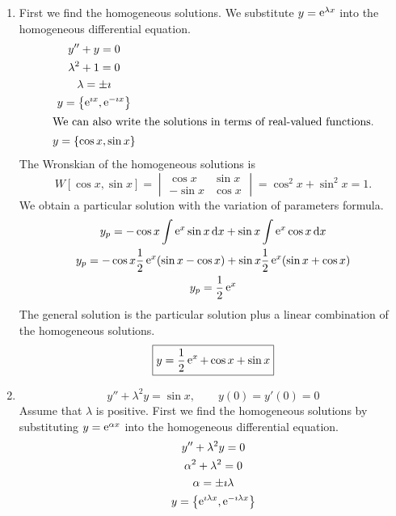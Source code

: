 {%
\begin{Solution}
  \label{solution y+y=ex}
  \begin{enumerate}
  \item
    First we find the homogeneous solutions.  We substitute $y = \mathop{\mathrm{e}}\nolimits^{\lambda x}$
    into the homogeneous differential equation.
    \begin{gather*}
      y'' + y = 0 \\
      \lambda^2 + 1 = 0 \\
      \lambda = \pm \imath \\
      y = \left\{ \mathop{\mathrm{e}}\nolimits^{\imath x}, \mathop{\mathrm{e}}\nolimits^{-\imath x} \right\} \\
      \intertext{We can also write the solutions in terms of real-valued functions.}
      y = \left\{ \cos x, \sin x \right\}
    \end{gather*}
    The Wronskian of the homogeneous solutions is
    \[
    W[\cos x, \sin x] = 
    \begin{vmatrix}
      \cos x & \sin x \\
      - \sin x & \cos x
    \end{vmatrix}
    = \cos^2 x + \sin^2 x = 1.
    \]
    We obtain a particular solution with the variation of parameters formula.
    \begin{gather*}
      y_p = - \cos x \int \mathop{\mathrm{e}}\nolimits^x \sin x \,\mathrm{d} x + \sin x \int \mathop{\mathrm{e}}\nolimits^x \cos x \,\mathrm{d} x \\
      y_p = - \cos x \frac{1}{2} \mathop{\mathrm{e}}\nolimits^x (\sin x - \cos x)
      + \sin x \frac{1}{2} \mathop{\mathrm{e}}\nolimits^x (\sin x + \cos x) \\
      y_p = \frac{1}{2} \mathop{\mathrm{e}}\nolimits^x
    \end{gather*}
    The general solution is the particular solution plus a linear combination of
    the homogeneous solutions.
    \[
    \boxed{
      y = \frac{1}{2} \mathop{\mathrm{e}}\nolimits^x + \cos x + \sin x
      }
    \]
  \item
    \[
    y'' + \lambda^2 y = \sin x, \qquad
    y(0) = y'(0) = 0
    \]
    Assume that $\lambda$ is positive.
    First we find the homogeneous solutions by substituting $y = \mathop{\mathrm{e}}\nolimits^{\alpha x}$
    into the homogeneous differential equation.
    \begin{gather*}
      y'' + \lambda^2 y = 0 \\
      \alpha^2 + \lambda^2 = 0 \\
      \alpha = \pm \imath \lambda \\
      y = \left\{ \e^{\imath \lambda x}, \e^{-\imath \lambda x} \right\} \\

\end{gather*}
\end{enumerate}
\end{Solution}}
